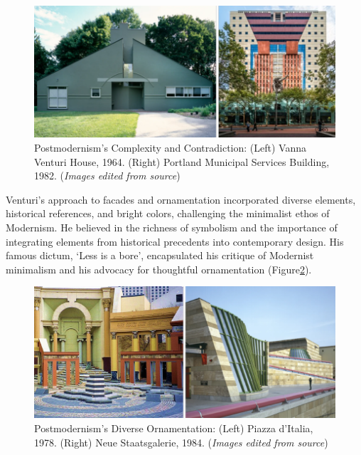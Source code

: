 \begin{figure}[htb]
\centering
\includegraphics[width= \linewidth]{Images/PostmodernismVenturi}
\caption{Postmodernism's Complexity and Contradiction: (Left) Vanna Venturi House, 1964. (Right) Portland Municipal Services Building, 1982. (\textit{Images edited from source})}
\label{fig:postmodernfacade}
\end{figure}

Venturi's approach to facades and ornamentation incorporated diverse elements, historical references, and bright colors, challenging the minimalist ethos of Modernism.
He believed in the richness of symbolism and the importance of integrating elements from historical precedents into contemporary design\cite{Venturi1971}.
His famous dictum, `Less is a bore', encapsulated his critique of Modernist minimalism and his advocacy for thoughtful ornamentation (Figure\ref{fig:postmodernOrnamnet}).

    \begin{figure}[htb]
        \centering
        \includegraphics[width= \linewidth]{Images/PostmodernOrnament}
        \caption{Postmodernism's Diverse Ornamentation: (Left) Piazza d’Italia, 1978. (Right) Neue Staatsgalerie, 1984. (\textit{Images edited from source})}
        \label{fig:postmodernOrnamnet}
    \end{figure}

